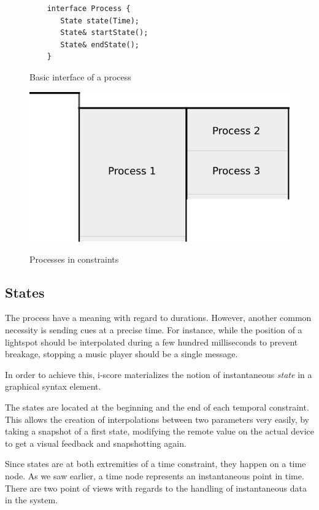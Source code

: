 \documentclass{sigchi}
\begin{document}
\begin{figure}
	\centering
\begin{lstlisting}
    interface Process {
       State state(Time);
       State& startState();
       State& endState();
    }
\end{lstlisting}
\caption{Basic interface of a process}
\label{fig.processInterface}
\end{figure}
\begin{figure}
	\centering
	\includegraphics[scale=0.5]{images/processes.png}
	\label{fig.processes}
	\caption{Processes in constraints}
\end{figure}


\subsection{States}
The process have a meaning with regard to durations. However, another common necessity is sending cues at a precise time. For instance, while the position of a lightspot should be interpolated during a few hundred milliseconds to prevent breakage, stopping a music player should be a single message.

In order to achieve this, i-score materializes the notion of instantaneous \textit{state} in a graphical syntax element.

The states are located at the beginning and the end of each temporal constraint. This allows the creation of interpolations between two parameters very easily, by taking a snapshot of a first state, modifying the remote value on the actual device to get a visual feedback and snapshotting again. 

Since states are at both extremities of a time constraint, they happen on a time node. As we saw earlier, a time node represents an instantaneous point in time. 
There are two point of views with regards to the handling of instantaneous data in the system.
\end{document}
